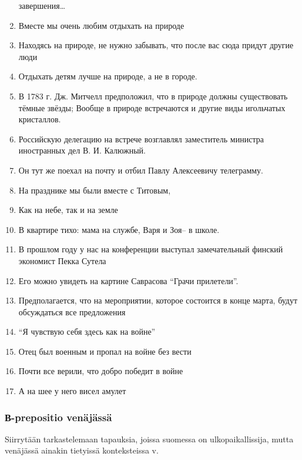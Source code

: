 \documentclass[]{scrartcl}
\begin{document}
\begin{enumerate}
  завершения\ldots{}
\item
  Вместе мы очень любим отдыхать на природе
\item
  Находясь на природе, не нужно забывать, что после вас сюда придут
  другие люди
\item
  Отдыхать детям лучше на природе, а не в городе.
\item
  В 1783 г. Дж. Митчелл предположил, что в природе должны существовать
  тёмные звёзды; Вообще в природе встречаются и другие виды игольчатых
  кристаллов.
\item
  Российскую делегацию на встрече возглавлял заместитель министра
  иностранных дел В. И. Калюжный.
\item
  Он тут же поехал на почту и отбил Павлу Алексеевичу телеграмму.
\item
  На празднике мы были вместе с Титовым,
\item
  Как на небе, так и на земле
\item
  В квартире тихо: мама на службе, Варя и Зоя-- в школе.
\item
  В прошлом году у нас на конференции выступал замечательный финский
  экономист Пекка Сутела
\item
  Его можно увидеть на картине Саврасова ``Грачи прилетели''.
\item
  Предполагается, что на мероприятии, которое состоится в конце марта,
  будут обсуждаться все предложения
\item
  ``Я чувствую себя здесь как на войне''
\item
  Отец был военным и пропал на войне без вести
\item
  Почти все верили, что добро победит в войне
\item
  А на шее у него висел амулет
\end{enumerate}

\subsubsection{В-prepositio
venäjässä}\label{ux432-prepositio-venuxe4juxe4ssuxe4}

Siirrytään tarkastelemaan tapauksia, joissa suomessa on
ulkopaikallissija, mutta venäjässä ainakin tietyissä konteksteissa v.
\end{document}
